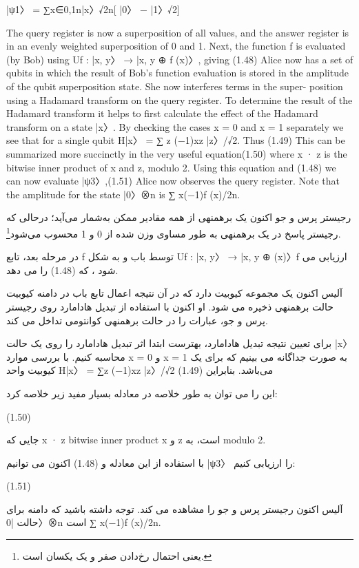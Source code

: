 \documentclass{book}
\begin{document}
	|ψ1〉 = ∑x∈{0,1}n|x〉√2n[ |0〉 − |1〉√2]
	
	
	
	The query register is now a superposition of all values, and the answer register is in an evenly weighted superposition of 0 and 1. Next, the function f is evaluated (by Bob)
	using Uf : |x, y〉 → |x, y ⊕ f (x)〉, giving (1.48) Alice now has a set of qubits in which the result of Bob’s function evaluation is stored
	in the amplitude of the qubit superposition state. She now interferes terms in the super-
	position using a Hadamard transform on the query register. To determine the result of
	the Hadamard transform it helps to first calculate the effect of the Hadamard transform
	on a state |x〉. By checking the cases x = 0 and x = 1 separately we see that for a single
	qubit H|x〉 = ∑
	z (−1)xz |z〉/√2. Thus (1.49) This can be summarized more succinctly in the very useful equation(1.50) where x · z is the bitwise inner product of x and z, modulo 2. Using this equation
	and (1.48) we can now evaluate |ψ3〉,(1.51) Alice now observes the query register. Note that the amplitude for the state |0〉⊗n is
	∑
	x(−1)f (x)/2n. 
	
	
	رجیستر پرس و جو اکنون یک برهمنهی از همه مقادیر ممکن به‌شمار می‌آید؛ درحالی که رجیستر پاسخ در یک برهمنهی به طور مساوی وزن شده از 0 و 1 محسوب می‌شود\footnote{یعنی احتمال رخ‌دادن صفر و یک یکسان است.}.
	
در مرحله بعد، تابع f توسط باب و به شکل Uf : |x, y〉 → |x, y ⊕ (x)〉f  ارزیابی می شود ، که (1.48) را می دهد.
	
	آلیس اکنون یک مجموعه کیوبیت دارد که در آن نتیجه اعمال تابع باب در دامنه کیوبیت حالت برهمنهی ذخیره می شود. او اکنون با استفاده از تبدیل هادامارد روی رجیستر پرس و جو، عبارات را در حالت برهمنهی کوانتومی تداخل می کند.
	
	برای تعیین نتیجه تبدیل هادامارد، بهترست ابتدا اثر تبدیل هادامارد را روی یک حالت |x〉 محاسبه کنیم. با بررسی موارد x = 0 و x = 1 به صورت جداگانه می بینیم که برای یک کیوبیت واحد H|x〉 = ∑z (−1)xz |z〉/√2 می‌باشد. بنابراین (1.49)
	
	این را می توان به طور خلاصه در معادله بسیار مفید زیر خلاصه کرد:
	
	(1.50)
	
	جایی که x · z bitwise inner product x و z است، به modulo 2.
	
	با استفاده از این معادله و (1.48) اکنون می توانیم |ψ3〉 را ارزیابی کنیم:
	
	(1.51)
	
	آلیس اکنون رجیستر پرس و جو را مشاهده می کند. توجه داشته باشید که دامنه برای حالت |0〉⊗n است
	∑
	x(−1)f (x)/2n.
	
\end{document}
